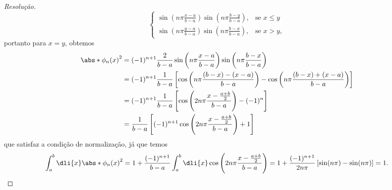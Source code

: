 \begin{proof}[Resolução]
\begin{equation*}
\begin{cases}
         \displaystyle \sin\left(n\pi \frac{x - a}{b-a}\right)\sin\left(n\pi \frac{b - y}{b-a}\right),&\text{se }x \leq y\\
         \displaystyle \sin\left(n\pi \frac{y - a}{b-a}\right)\sin\left(n\pi \frac{b - x}{b-a}\right),&\text{se }x > y,
      \end{cases}
   \end{equation*}
   portanto para \(x = y\), obtemos
   \begin{align*}
      \abs*{\phi_n(x)}^2 &= (-1)^{n+1} \frac{2}{b - a} \sin\left(n\pi \frac{x - a}{b-a}\right) \sin\left(n\pi \frac{b - x}{b-a}\right)\\
                         &= (-1)^{n+1} \frac{1}{b-a} \left[\cos\left(n\pi\frac{(b - x) - (x - a)}{b-a}\right) - \cos\left(n\pi\frac{(b - x) + (x - a)}{b - a}\right)\right]\\
                         &= (-1)^{n+1} \frac{1}{b - a}\left[\cos\left(2n\pi \frac{x - \frac{a + b}{2}}{b-a}\right)- (-1)^{n}\right]\\
                         &= \frac{1}{b - a} \left[(-1)^{n+1}\cos\left(2 n \pi \frac{x - \frac{a + b}{2}}{b - a}\right) + 1\right]
   \end{align*}
   que satisfaz a condição de normalização, já que temos
   \begin{equation*}
      \int_a^b \dli{x} \abs*{\phi_n(x)}^2 = 1 + \frac{(-1)^{n+1}}{b - a}\int_a^b\dli{x} \cos\left(2 n \pi \frac{x - \frac{a + b}{2}}{b - a}\right) = 1 + \frac{(-1)^{n+1}}{2 n \pi} \left[\sin(n \pi) - \sin(n \pi)\right] = 1.
   \end{equation*}


\end{proof}
